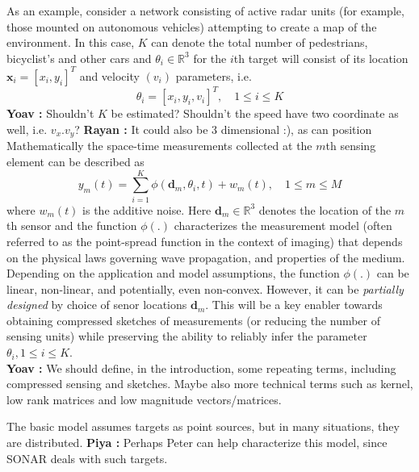 \documentclass{article}
\newcommand{\comment}[3]{{\color{#1} {\bf #2 :} #3}}
\newcommand{\yoav}[1]{\comment{magenta}{Yoav}{#1}}
\newcommand{\piya}[1]{\comment{blue}{Piya}{#1}}
\newcommand{\rayan}[1]{\comment{red}{Rayan}{#1}}
\begin{document}
As an example, consider a network consisting of active radar units (for example, those mounted on autonomous vehicles) attempting to create a map of the environment. In this case, $K$ can denote the total number of pedestrians, bicyclist's and other cars and $\theta_i\in\mathbb{R}^3$ for the $i$th target will consist of its location $\mathbf{x}_i=[x_i,y_i]^T$ and velocity $(v_i)$ parameters, i.e.
\begin{equation} \theta_i = [ x_i, y_i, v_i ]^T, \quad 1\leq i\leq K  
\end{equation} 
\yoav{Shouldn't $K$ be estimated?  Shouldn't the speed have two coordinate as well, i.e. $v_x.v_y$?}
\rayan{It could also be 3 dimensional :), as can position}
Mathematically the space-time measurements collected at the $m$th sensing element can be described as \begin{equation} 
y_m (t) = \sum_{i=1}^{K} \phi (\mathbf{d}_m,\theta_i,t) + w_m(t), \quad 1\leq m\leq M
\end{equation}
where $w_m(t)$ is the additive noise. Here $\mathbf{d}_m\in \mathbb{R}^3$ denotes the location of the $m$th sensor and the function $\phi(.)$ characterizes the measurement model (often referred to as the point-spread function in the context of imaging) that depends on the physical laws governing wave propagation, and properties of the medium. Depending on the application and model assumptions, the function $\phi(.)$ can be linear, non-linear, and potentially, even non-convex. However, it can be {\em partially designed} by choice of senor locations $\mathbf{d}_m$. This will be a key enabler towards obtaining compressed sketches of measurements (or reducing the number of sensing units) while preserving the ability to reliably infer the parameter $\theta_i, 1\leq i\leq K$.\\
\yoav{We should define, in the introduction, some repeating terms, including compressed sensing and sketches. Maybe also more technical terms such as kernel, low rank matrices and low magnitude vectors/matrices.}


The basic model assumes targets as point sources, but in many situations, they are distributed. \piya{Perhaps Peter can help characterize this model, since SONAR deals with such targets}. 
\end{document}
